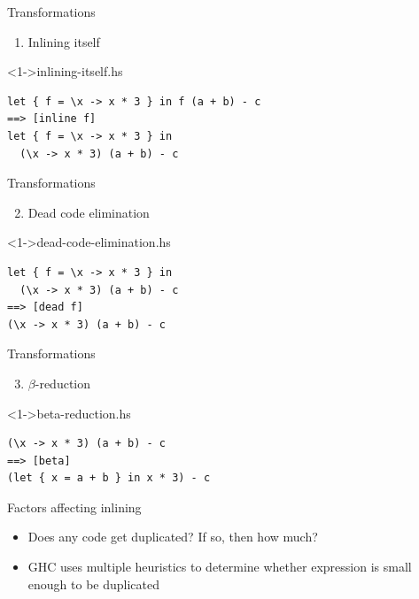 \documentclass[hyperref={pdfpagelabels=false},xcolor={dvipsnames},compress,table,usenames,dvipsnames]{beamer}
\begin{document}
    \begin{frame}[fragile]{Transformations}
        \begin{enumerate}
        \setcounter{enumi}{0}
        \item Inlining itself
        \end{enumerate}
        \begin{exampleblock}
            <1->{inlining-itself.hs}
            \begin{lstlisting}
let { f = \x -> x * 3 } in f (a + b) - c
==> [inline f]
let { f = \x -> x * 3 } in
  (\x -> x * 3) (a + b) - c
            \end{lstlisting}
        \end{exampleblock}
    \end{frame}
    
    \begin{frame}[fragile]{Transformations}
        \begin{enumerate}
        \setcounter{enumi}{1}
        \item Dead code elimination
        \end{enumerate}
        \begin{exampleblock}
            <1->{dead-code-elimination.hs}
            \begin{lstlisting}
let { f = \x -> x * 3 } in
  (\x -> x * 3) (a + b) - c
==> [dead f]
(\x -> x * 3) (a + b) - c
            \end{lstlisting}
        \end{exampleblock}
    \end{frame}
    
    \begin{frame}[fragile]{Transformations}
        \begin{enumerate}
        \setcounter{enumi}{2}
        \item $\beta$-reduction
        \end{enumerate}
        \begin{exampleblock}
            <1->{beta-reduction.hs}
            \begin{lstlisting}
(\x -> x * 3) (a + b) - c
==> [beta]
(let { x = a + b } in x * 3) - c
            \end{lstlisting}
        \end{exampleblock}
    \end{frame}

    \begin{frame}{Factors affecting inlining}
        \begin{itemize}
            \item Does any code get duplicated? If so, then how much? \pause
            \item GHC uses multiple heuristics to determine whether expression is small enough to be duplicated
        \end{itemize}
    \end{frame}
\end{document}
